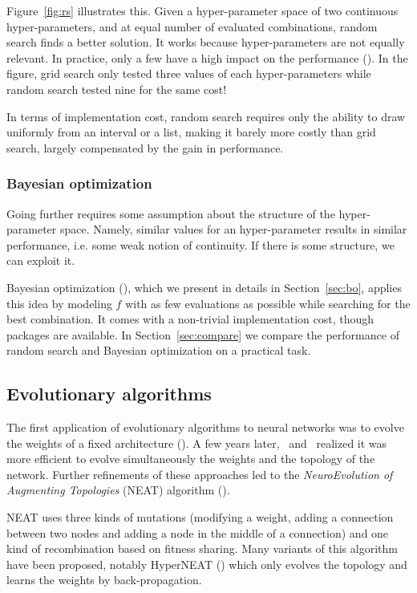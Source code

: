 Figure~\ref{fig:rs} illustrates this. Given a hyper-parameter space of two continuous hyper-parameters, and at equal number of evaluated combinations, random search finds a better solution. It works because hyper-parameters are not equally relevant. In practice, only a few have a high impact on the performance (\textcite{bergstra2012JMLR}). In the figure, grid search only tested three values of each hyper-parameters while random search tested nine for the same cost!

In terms of implementation cost, random search requires only the ability to draw uniformly from an interval or a list, making it barely more costly than grid search, largely compensated by the gain in performance.

\subsubsection{Bayesian optimization}

Going further requires some assumption about the structure of the hyper-parameter space. Namely, similar values for an hyper-parameter results in similar performance, i.e. some weak notion of continuity. If there is some structure, we can exploit it.

Bayesian optimization (\textcite{bergstra2011NIPS}), which we present in details in Section~\ref{sec:bo}, applies this idea by modeling $f$ with as few evaluations as possible while searching for the best combination. It comes with a non-trivial implementation cost, though packages are available. In Section~\ref{sec:compare} we compare the performance of random search and Bayesian optimization on a practical task.

\subsection{Evolutionary algorithms}

The first application of evolutionary algorithms to neural networks was to evolve the weights of a fixed architecture (\textcite{miller1989}). A few years later,~\textcite{braun1993} and~\textcite{angeline1994} realized it was more efficient to evolve simultaneously the weights and the topology of the network. Further refinements of these approaches led to the \textit{NeuroEvolution of Augmenting Topologies} (NEAT) algorithm (\textcite{stanley2002EC}). 

NEAT uses three kinds of mutations (modifying a weight, adding a connection between two nodes and adding a node in the middle of a connection) and one kind of recombination based on fitness sharing. Many variants of this algorithm have been proposed, notably HyperNEAT (\textcite{stanley2009}) which only evolves the topology and learns the weights by back-propagation. 

